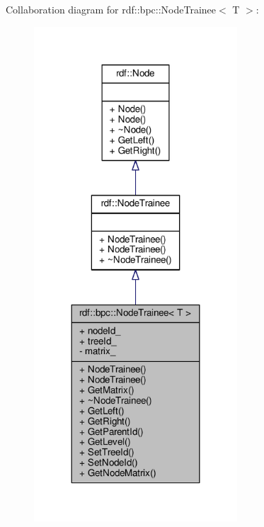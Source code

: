 Collaboration diagram for rdf\+:\+:bpc\+:\+:Node\+Trainee$<$ T $>$\+:
\nopagebreak
\begin{figure}[H]
\begin{center}
\leavevmode
\includegraphics[width=215pt]{classrdf_1_1bpc_1_1NodeTrainee__coll__graph}
\end{center}
\end{figure}
